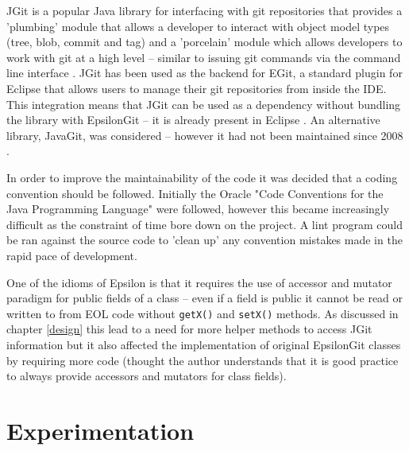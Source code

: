 \documentclass[11pt]{book}
\newcommand{\code}[1]{\texttt{#1}}
\begin{document}
JGit is a popular Java library for interfacing with git repositories that provides a 'plumbing' module that allows a developer to interact with object model types (tree, blob, commit and tag) and a 'porcelain' module which allows developers to work with git at a high level -- similar to issuing git commands via the command line interface \cite{jgit}. JGit has been used as the backend for EGit, a standard plugin for Eclipse that allows users to manage their git repositories from inside the IDE. This integration means that JGit can be used as a dependency without bundling the library with EpsilonGit -- it is already present in Eclipse \cite{egit}. An alternative library, JavaGit, was considered -- however it had not been maintained since 2008 \cite{javagit}.

In order to improve the maintainability of the code it was decided that a coding convention should be followed. Initially the Oracle "Code Conventions for the Java Programming Language" were followed, however this became increasingly difficult as the constraint of time bore down on the project. A lint program could be ran against the source code to 'clean up' any convention mistakes made in the rapid pace of development.

One of the idioms of Epsilon is that it requires the use of accessor and mutator paradigm for public fields of a class -- even if a field is public it cannot be read or written to from EOL code without \code{getX()} and \code{setX()} methods. As discussed in chapter \ref{design} this lead to a need for more helper methods to access JGit information but it also affected the implementation of original EpsilonGit classes by requiring more code (thought the author understands that it is good practice to always provide accessors and mutators for class fields). 



\section{Experimentation}

	
\end{document}
